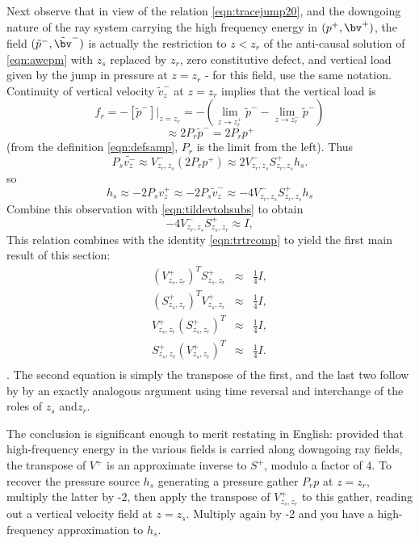 Next observe that in view of the relation \ref{eqn:tracejump20}, and
the downgoing nature of the ray system carrying the high frequency
energy in $(p^+,\bv^+)$, the field $(\tilde{p}^-,\tilde{\bv}^-)$ is
actually the restriction to $z<z_r$ of the anti-causal solution of \ref{eqn:awepm}
with $z_s$ replaced by $z_r$, zero constitutive defect, and vertical
load given by the jump in pressure at $z=z_r$ - for this field, use
the same notation. Continuity of vertical
velocity $\tilde{v}^-_z$ at $z=z_r$ implies that the vertical load is
\[
  f_r = -[\tilde{p}^-]|_{z=z_r} =-(\lim_{z\rightarrow
    z_r^+}\tilde{p}^- - \lim_{z\rightarrow
    z_r^-}\tilde{p}^-)
\]
\[
  \approx 2 P_r \tilde{p}^- = 2 P_r p^+
\]
(from the definition \ref{eqn:defsamp}, $P_r$ is the limit from the
left). Thus
\[
  P_s \tilde{v^-_z} \approx V^-_{z_r,z_s}(2 P_rp^+) \approx
  2V^-_{z_r,z_s}S^+_{z_r,z_s}h_s.
\]
so
\[
  h_s \approx -2 P_s v^+_z \approx -2 P_s \tilde{v}^-_z \approx
  -4V^-_{z_r,z_s}S^+_{z_r,z_s}h_s
\]
Combine this observation with \ref{eqn:tildevtohsubs} to obtain
\[
 -4  V^-_{z_r,z_s} S^+_{z_s,z_r}  \approx  I,
\]
This relation combines with the identity \ref{eqn:trtrcomp} to
yield the first main result of this section:
\begin{eqnarray}
  \label{eqn:approxinv}
  (V^+_{z_s,z_r})^T S^+_{z_s,z_r} & \approx & \frac{1}{4}I, \nonumber\\
  (S^+_{z_s,z_r})^T V^+_{z_s,z_r} & \approx & \frac{1}{4}I, \nonumber\\
  V^+_{z_s,z_r} (S^+_{z_s,z_r})^T & \approx & \frac{1}{4}I, \nonumber\\
  S^+_{z_s,z_r} (V^+_{z_s,z_r})^T & \approx & \frac{1}{4}I.\\
\end{eqnarray}.
The second equation is simply the transpose of the first, and the
last two follow by by an exactly analogous argument using time
reversal and interchange of the roles of $z_s$ and$z_r$.

The conclusion is significant enough to merit restating in English:
provided that high-frequency energy in the various fields is carried
along downgoing ray fields, the transpose of $V^+$ is an approximate
inverse to $S^+$, modulo a factor of 4. To recover the pressure source
$h_s$ generating a pressure gather $P_rp$ at $z=z_r$, multiply the
latter by -2, then apply the transpose of $V^+_{z_s,z_r}$ to this
gather, reading out a vertical velocity field at $z=z_s$. Multiply
again by -2 and you have a high-frequency approximation to $h_s$.

